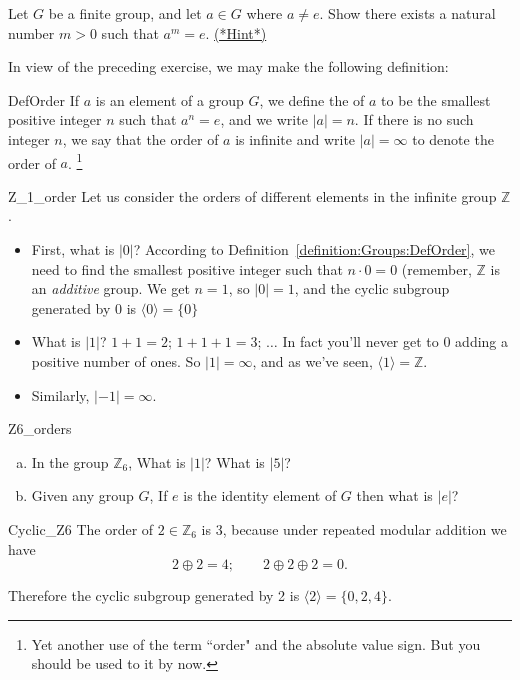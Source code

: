 \begin{exercise}{90}
Let $G$ be a finite group, and let $a \in G$ where $a \neq e$. Show there exists a natural number $m>0$ such that $a^m = e$.
\hyperref[sec:Groups:Hints]{(*Hint*)}
\end{exercise}
In view of the preceding exercise, we may make the following definition:

\begin{defn}{DefOrder}
If $a$ is an element of a group $G$, we define the  of $a$ to be the smallest positive integer $n$ such that $a^n= e$,
and we write $|a| = n$\label{noteelementorder}. If there is no such
integer $n$, we say that the order of $a$ is infinite and  write $|a|
= \infty$ to denote the order of $a$. \footnote{Yet another use of the term ``order" and the absolute value sign.  But you should be used to it by now.}
\end{defn} 

\begin{example}{Z_1_order}
Let us consider the orders of different elements in the infinite group $\mathbb Z$.
\begin{itemize}
\item
First, what is $| 0 |$?  According to Definition~\ref{definition:Groups:DefOrder}, we need to find the smallest positive integer such that $n \cdot 0 = 0$  (remember, $\mathbb Z$ is an \emph{additive} group. We get $n=1$, so $| 0 | =1$, and the cyclic subgroup generated by $0$ is $\langle 0 \rangle = \{ 0 \}$
\item
What is $| 1 |$?  $1 + 1 = 2$; $1 + 1 + 1 = 3$; $\ldots$  In fact you'll never get to $0$ adding a positive number of ones.  So $| 1 | = \infty$, and as we've seen, $\langle 1 \rangle = \mathbb Z$.
\item
Similarly, $| -1 | = \infty$.
\end{itemize}
\end{example}

\begin{exercise}{Z6_orders}
\begin{enumerate}[(a)]
\item
In the group ${\mathbb Z}_6$, What is $| 1 |$? What is $| 5 |$?
\item
 Given any group $G$, If $e$ is the identity element of $G$ then what is $|e|$?
\end{enumerate}
 \end{exercise}

\begin{example}{Cyclic_Z6}
The order of $2 \in {\mathbb Z}_6$ is 3, because under repeated modular addition we have
\[
2 \oplus 2 = 4;\qquad  2 \oplus  2 \oplus  2 = 0.\]

\noindent
Therefore the cyclic subgroup generated by 2 is $\langle 2 \rangle  = \{ 0, 2, 4\}$.  
\end{example}


